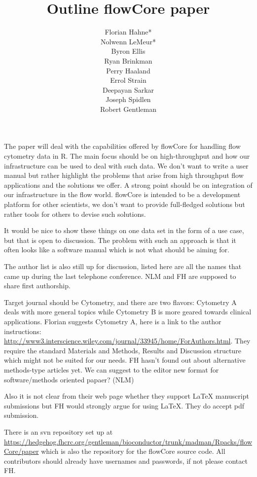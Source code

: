 \documentclass[12pt]{article}
\title{Outline flowCore paper}
\author{Florian Hahne*\\
  Nolwenn LeMeur*\\
  Byron Ellis\\
  Ryan Brinkman\\
  Perry Haaland\\
  Errol Strain\\
  Deepayan Sarkar\\
  Joseph Spidlen\\
  Robert Gentleman
 }
\begin{document}
\maketitle

\vspace{2ex} The paper will deal with the capabilities offered by
flowCore for handling flow cytometry data in R. The main focus should
be on high-throughput and how our infrastructure can be used to deal
with such data. We don't want to write a user manual but rather
highlight the problems that arise from high throughput flow
applications and the solutions we offer. A strong point should be on
integration of our infrastructure in the flow world. flowCore is
intended to be a development platform for other scientists, we don't
want to provide full-fledged solutions but rather tools for others to
devise such solutions.


It would be nice to show these things on one data set in the form of a
use case, but that is open to discussion. The problem with such an
approach is that it often looks like a software manual which is not
what should be aiming for. 

The author list is also still up for discussion, listed here are all
the names that came up during the last telephone conference. NLM and
FH are supposed to share first authorship.

Target journal should be Cytometry, and there are two flavors:
Cytometry A deals with more general topics while Cytometry B is more
geared towards clinical applications. Florian suggests Cytometry A,
here is a link to the author instructions:
\url{http://www3.interscience.wiley.com/journal/33945/home/ForAuthors.html}.
They require the standard Materials and Methods, Results and
Discussion structure which might not be suited for our needs. FH
hasn't found out about alternative methods-type articles yet.  We can
suggest to the editor new format for software/methods oriented papaer?
(NLM)

Also it is not clear from their web page whether they support LaTeX
manuscript submissions but FH would strongly argue for using
LaTeX. They do accept pdf submission.

There is an svn repository set up at
\url{https://hedgehog.fhcrc.org/gentleman/bioconductor/trunk/madman/Rpacks/flowCore/paper}
which is also the repository for the flowCore source code. All
contributors should already have usernames and passwords, if not
please contact FH.
\end{document}
